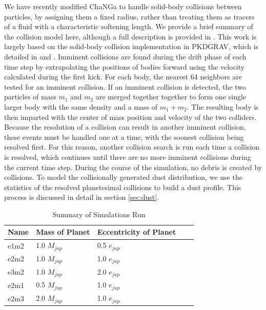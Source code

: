 \documentclass[fleqn,usenatbib]{mnras}
\begin{document}
We have recently modified {\sc ChaNGa} to handle solid-body collisions between particles, by assigning them a fixed radius, rather than treating them as tracers of a fluid with a 
characteristic softening length. We provide a brief summary of the collision model here, although a full description is provided in \citet{2019MNRAS.489.2159W}. This work is largely based 
on the solid-body collision implementation in {\sc PKDGRAV}, which is detailed in \citet{1994MNRAS.269..493R} and \citet{2000Icar..143...45R}. Imminent collisions are found during the 
drift phase of each time step by extrapolating the positions of bodies forward using the velocity calculated during the first kick. For each body, the nearest 64 neighbors are tested for an 
imminent collision. If an imminent collision is detected, the two particles of mass $m_{1}$ and $m_{2}$ are merged together together to form one single larger body with the same density 
and a mass of $m_{1} + m_{2}$. The resulting body is then imparted
with the center of mass position and velocity of the two
colliders. Because the resolution of a collision can result in 
another imminent collision, these events must be handled one at a time, with the soonest collision being resolved first. For this reason, another collision search is run each time a collision 
is resolved, which continues until there are no more imminent collisions during the current time step. During the course of the simulation, no debris is created by collisions. To model the 
collisionally generated dust distribution, we use the statistics of
the resolved planetesimal collisions to build a dust profile. This process is discussed in detail in section \ref{sec:dust}.

\begin{table}
\begin{center}
\caption{Summary of Simulations Run}
\begin{tabular}{lllll} \hline \hline
Name     & Mass of Planet & Eccentricity of Planet &  &  \\ \hline
e1m2 & 1.0 $M_{jup}$                     & 0.5 $e_{jup}$                            &  &  \\
e2m2      & 1.0 $M_{jup}$                     & 1.0 $e_{jup}$                             &  &  \\
e3m2 & 1.0 $M_{jup}$                     & 2.0 $e_{jup}$                             &  &  \\
e2m1 & 0.5 $M_{jup}$                   & 1.0 $e_{jup}$                             &  &  \\
e2m3 & 2.0 $M_{jup}$                     & 1.0 $e_{jup}$                             &  &  \\ \hline
\end{tabular}
\label{tab:sims}
\end{center}
\end{table}
\end{document}
